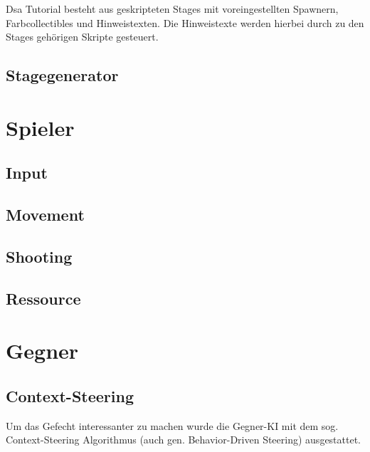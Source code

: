 \documentclass[a4paper,10pt,ngerman,fontsize=12pt]{scrreprt}
\begin{document}
Dsa Tutorial besteht aus geskripteten Stages mit voreingestellten Spawnern, Farbcollectibles und Hinweistexten. Die Hinweistexte werden hierbei durch zu den Stages gehörigen Skripte gesteuert.



\subsection{Stagegenerator}

\lipsum[3]



\section{Spieler}

\lipsum[3]



\subsection{Input}

\lipsum[3]


\subsection{Movement}

\lipsum[3]


\subsection{Shooting}

\lipsum[3]


\subsection{Ressource}

\lipsum[3]




\section{Gegner}

\lipsum[3]



\subsection{Context-Steering}

Um das Gefecht interessanter zu machen wurde die Gegner-KI mit dem sog. Context-Steering Algorithmus\cite{qCtxSteer} (auch gen. Behavior-Driven Steering) ausgestattet.
\end{document}
